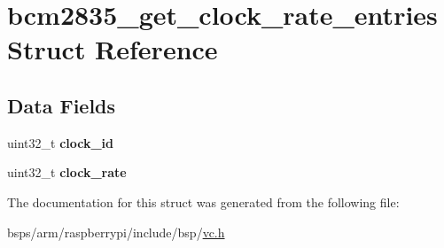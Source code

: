 \hypertarget{structbcm2835__get__clock__rate__entries}{}\section{bcm2835\+\_\+get\+\_\+clock\+\_\+rate\+\_\+entries Struct Reference}
\label{structbcm2835__get__clock__rate__entries}
\subsection*{Data Fields}
\begin{DoxyCompactItemize}
\item 
\mbox{\label{structbcm2835__get__clock__rate__entries_ae410812bcd646f8ebf0a31128e5f5aed}} 
uint32\+\_\+t {\bfseries clock\+\_\+id}
\item 
\mbox{\label{structbcm2835__get__clock__rate__entries_aee862dd49f64642a33d49fbcaad0726c}} 
uint32\+\_\+t {\bfseries clock\+\_\+rate}
\end{DoxyCompactItemize}


The documentation for this struct was generated from the following file\+:\begin{DoxyCompactItemize}
\item 
bsps/arm/raspberrypi/include/bsp/\mbox{\hyperlink{vc_8h}{vc.\+h}}\end{DoxyCompactItemize}
